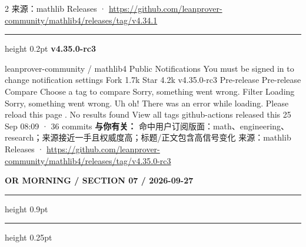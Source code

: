 \documentclass[10.5pt]{ctexart}
\begin{document}
\begin{multicols}{2}
{\footnotesize\color{ormuted} 来源：mathlib Releases · \url{https://github.com/leanprover-community/mathlib4/releases/tag/v4.34.1}}
\vspace{2mm}
\hrule height 0.2pt
\vspace{2mm}
{\large\bfseries v4.35.0-rc3}\par
leanprover-community / mathlib4 Public Notifications You must be signed in to change notification settings Fork 1.7k Star 4.2k v4.35.0-rc3 Pre-release Pre-release Compare Choose a tag to compare Sorry, something went wrong. Filter Loading Sorry, something went wrong. Uh oh! There was an error while loading. Please reload this page . No results found View all tags github-actions released this 25 Sep 08:09 · 36 commits
\textbf{与你有关：} 命中用户订阅版面：math、engineering、research；来源接近一手且权威度高；标题/正文包含高信号变化
{\footnotesize\color{ormuted} 来源：mathlib Releases · \url{https://github.com/leanprover-community/mathlib4/releases/tag/v4.35.0-rc3}}
\end{multicols}
\newpage
{\small\bfseries OR MORNING / SECTION 07 / 2026-09-27}
\vspace{2mm}
\hrule height 0.9pt
\vspace{1.5mm}
\hrule height 0.25pt
\vspace{4mm}
\end{document}
